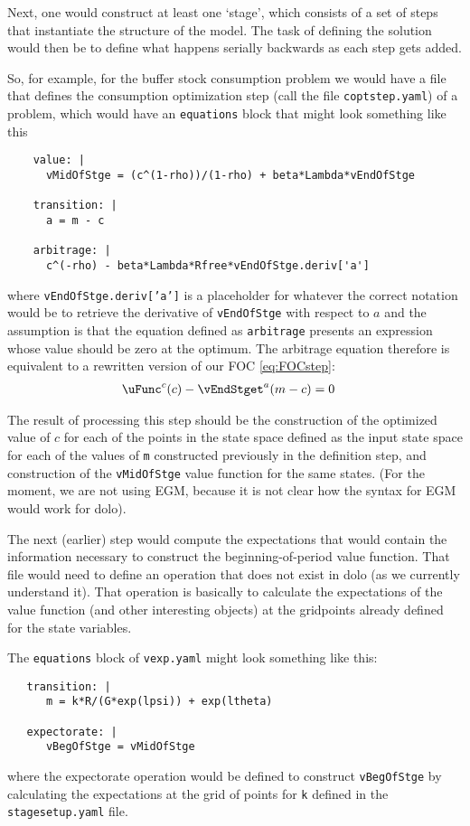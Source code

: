 \documentclass[SolvingMicroDSOPs]{subfiles}
\begin{document}
Next, one would construct at least one `stage', which consists of a set of steps that instantiate the structure of the model.  The task of defining the solution would then be to define what happens serially backwards as each step gets added.

So, for example, for the buffer stock consumption problem we would have a file that defines the consumption optimization step (call the file \texttt{coptstep.yaml}) of a problem, which would have an \texttt{equations} block that might look something like this

\begin{verbatim}
    value: |
      vMidOfStge = (c^(1-rho))/(1-rho) + beta*Lambda*vEndOfStge

    transition: |
      a = m - c

    arbitrage: |
      c^(-rho) - beta*Lambda*Rfree*vEndOfStge.deriv['a'] 

\end{verbatim}
where \texttt{vEndOfStge.deriv['a']} is a placeholder for whatever the correct notation would be to retrieve the derivative of \texttt{vEndOfStge} with respect to $a$ and the assumption is that the equation defined as \texttt{arbitrage} presents an expression whose value should be zero at the optimum.  The arbitrage equation therefore is equivalent to a rewritten version of our FOC \eqref{eq:FOCstep}:
\begin{align}
  \uFunc^{{c}}(c) - \vEndStget^{{a}}(m-c) & = 0
\end{align}

The result of processing this step should be the construction of the optimized value of $c$ for each of the points in the state space defined as the input state space for each of the values of \texttt{m} constructed previously in the definition step, and construction of the \texttt{vMidOfStge} value function for the same states. (For the moment, we are not using EGM, because it is not clear how the syntax for EGM would work for dolo).

The next (earlier) step would compute the expectations that would contain the information necessary to construct the beginning-of-period value function.  That file would need to define an operation that does not exist in dolo (as we currently understand it).  That operation is basically to calculate the expectations of the value function (and other interesting objects) at the gridpoints already defined for the state variables.

The \texttt{equations} block of \texttt{vexp.yaml} might look something like this:
\begin{verbatim}
   transition: |
      m = k*R/(G*exp(lpsi)) + exp(ltheta)

   expectorate: |
      vBegOfStge = vMidOfStge

\end{verbatim}
where the expectorate operation would be defined to construct \texttt{vBegOfStge} by calculating the expectations at the grid of points for \texttt{k} defined in the \texttt{stagesetup.yaml} file.
\end{document}
